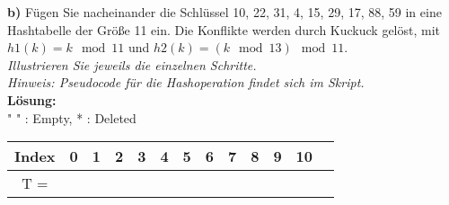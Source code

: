 \noindent
\textbf{b)} Fügen Sie nacheinander die Schlüssel 10, 22, 31, 4, 15, 29, 17, 88, 59 in eine Hashtabelle der Größe 11 ein. Die Konflikte werden durch Kuckuck gelöst, mit $h1(k) = k \mod 11$ und $h2(k) = (k \mod 13) \mod 11$.\\

\noindent
\textit{Illustrieren Sie jeweils die einzelnen Schritte.\\
	Hinweis: Pseudocode für die Hashoperation findet sich im Skript.}\\
	
\noindent
\textbf{Lösung:}\\ "  " : Empty, * : Deleted\\
\begin{center}
\begin{tabular}{|c|c|c|c|c|c|c|c|c|c|c|c|c|}
\hline
Index & 0 & 1 & 2 & 3 & 4 & 5 & 6 & 7 & 8 & 9 & 10\\
\hline
T = & & & & & & & & & & & \\
\hline
\end{tabular}
\end{center}

